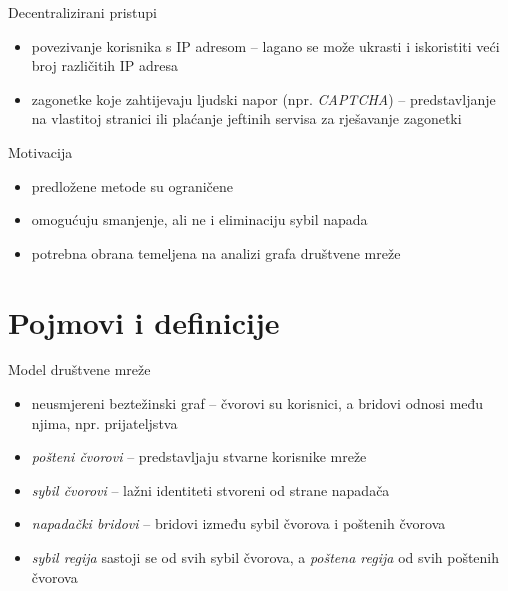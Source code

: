 \documentclass{beamer}
\begin{document}
\begin{frame}{Decentralizirani pristupi}
  \begin{itemize}
    \item povezivanje korisnika s IP adresom -- lagano se može ukrasti i iskoristiti veći broj različitih IP adresa
    \item zagonetke koje zahtijevaju ljudski napor (npr. \textit{CAPTCHA}) -- predstavljanje na vlastitoj stranici ili plaćanje jeftinih servisa za rješavanje zagonetki
  \end{itemize}
\end{frame}

\begin{frame}{Motivacija}
  \begin{itemize}
    \item predložene metode su ograničene
    \item omogućuju smanjenje, ali ne i eliminaciju sybil napada
    \item potrebna obrana temeljena na analizi grafa društvene mreže
  \end{itemize}
\end{frame}

\section{Pojmovi i definicije}

\begin{frame}{Model društvene mreže}
  \begin{itemize}
    \item neusmjereni beztežinski graf -- čvorovi su korisnici, a bridovi odnosi među njima, npr. prijateljstva
    \item \textit{pošteni čvorovi} -- predstavljaju stvarne korisnike mreže
    \item \textit{sybil čvorovi} -- lažni identiteti stvoreni od strane napadača
    \item \textit{napadački bridovi} -- bridovi između sybil čvorova i poštenih čvorova
    \item \textit{sybil regija} sastoji se od svih sybil čvorova, a \textit{poštena regija} od svih poštenih čvorova
  \end{itemize}
\end{frame}
\end{document}
